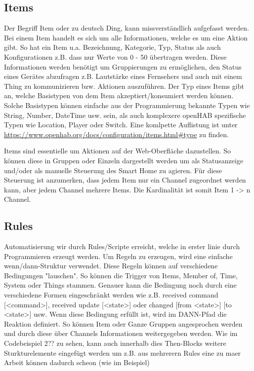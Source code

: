 \subsection{Items}
Der Begriff Item oder zu deutsch Ding, kann missverständlich aufgefasst werden. Bei einem Item handelt es sich um alle Informationen, welche es um eine Aktion gibt. So hat ein Item u.a. Bezeichnung, Kategorie, Typ, Status als auch Konfigurationen z.B. dass nur Werte von 0 - 50 übertragen werden. Diese Informationen werden benötigt um Gruppierungen zu ermöglichen, den Status eines Gerätes abzufragen z.B. Lautstärke eines Fernsehers und auch mit einem Thing zu kommunizieren bzw. Aktionen auszuführen. Der Typ eines Items gibt an, welche Basistypen von dem Item akzeptiert/konsumiert werden können. Solche Basistypen können einfache aus der Programmierung bekannte Typen wie String, Number, DateTime usw. sein, als auch komplexere openHAB spezifische Typen wie Location, Player oder Switch. Eine komlpette Auflistung ist unter \url{https://www.openhab.org/docs/configuration/items.html#type} zu finden.

Items sind essentielle um Aktionen auf der Web-Oberfläche dazustellen. So können diese in Gruppen oder Einzeln dargestellt werden um als Statusanzeige und/oder als manuelle Steuerung des Smart Home zu agieren. Für diese Steuerung ist anzumerken, dass jedem Item nur ein Channel zugeordnet werden kann, aber jedem Channel mehrere Items. Die Kardinalität ist somit Item 1 -> n Channel. 

\subsection{Rules}
Automatisierung wir durch Rules/Scripte erreicht, welche in erster linie durch Programmieren erzeugt werden. Um Regeln zu erzeugen, wird eine einfache wenn/dann-Struktur verwendet. Diese Regeln können auf verschiedene Bedingungen "lauschen". So können die Trigger von Items, Member of, Time, System oder Things stammen. Genauer kann die Bedingung noch durch eine verschiedene Formen eingeschränkt werden wie z.B. received command [<command>],  received update [<state>] oder changed [from <state>] [to <state>] usw.
Wenn diese Bedingung erfüllt ist, wird im DANN-Pfad die Reaktion definiert. So können Item oder Ganze Gruppen angesprochen werden und durch diese über Channels Informationen weitergegeben werden.
Wie im Codebeispiel 2?? zu sehen, kann auch innerhalb dies Then-Blocks weitere Sturkturelemente eingefügt werden um z.B. aus mehrerern Rules eine zu maer Arbeit können dadurch scheon (wie im Beispiel)

